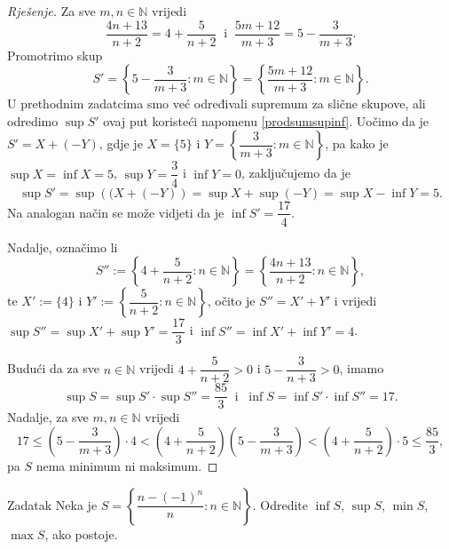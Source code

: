 \begin{proof}[Rješenje]
Za sve \(m, n\in \mathbb{N}\) vrijedi \[\dfrac{4n+13}{n+2}=4+\dfrac{5}{n+2}\;\;\text{i}\;\;\dfrac{5m+12}{m+3}=5-\dfrac{3}{m+3}.\]
Promotrimo skup 
\[S'=\left\{5-\dfrac{3}{m+3} : m\in \mathbb{N}\right\}=\left\{\dfrac{5m+12}{m+3} : m\in \mathbb{N}\right\}.\]
U prethodnim zadatcima smo već određivali supremum za slične skupove, ali odredimo $\sup{S'}$ ovaj put koristeći napomenu \ref{prodsumsupinf}. Uočimo da je \(S'=X+(-Y)\), gdje je \(X=\{5\}\) i \(Y=\left\{\dfrac{3}{m+3} : m\in \mathbb{N}\right\}\), pa kako je \(\sup{X}=\inf{X}=5\), \(\sup{Y}=\dfrac{3}{4}\) i \(\inf{Y}=0\), zaključujemo da je \[\sup{S'}=\sup\left((X+(-Y)\right)=\sup{X}+\sup(-Y)=\sup{X}-\inf{Y}=5.\] Na analogan način se može vidjeti da je $\inf{S'}=\dfrac{17}{4}$. 

Nadalje, označimo li \[S'':=\left\{4+\dfrac{5}{n+2} : n\in \mathbb{N}\right\}=\left\{\dfrac{4n+13}{n+2} : n\in \mathbb{N}\right\},\]
te $X':=\{4\}$ i $Y':=\left\{\dfrac{5}{n+2} : n\in \mathbb{N}\right\}$, očito je $S''=X'+Y'$ i vrijedi $\sup{S''}=\sup{X'}+\sup{Y'}=\dfrac{17}{3}$ i $\inf{S''}=\inf{X'}+\inf{Y'}=4$.

Budući da za sve \(n\in \mathbb{N}\) vrijedi \(4+\dfrac{5}{n+2}>0\) i \(5-\dfrac{3}{n+3}> 0\), imamo 
\[\sup{S}=\sup{S'}\cdot \sup{S''}=\dfrac{85}{3} \;\;\text{i}\;\;\inf{S}=\inf{S'}\cdot \inf{S''}=17.\]
Nadalje, za sve $m, n\in \mathbb{N}$ vrijedi
$$
17\leq \left(5-\dfrac{3}{m+3}\right)\cdot 4<\left(4+\dfrac{5}{n+2}\right)\left(5-\dfrac{3}{m+3}\right)<\left(4+\dfrac{5}{n+2}\right)\cdot 5\leq \dfrac{85}{3},
$$
pa $S$ nema minimum ni maksimum.
\end{proof}
\begin{exercise}{Zadatak}
Neka je \(S=\left\{\dfrac{n-(-1)^n}{n} : n\in \mathbb{N}\right\}\). Odredite \(\inf{S}\), \(\sup{S}\), \(\min{S}\), \(\max{S}\), ako postoje.
\end{exercise}
